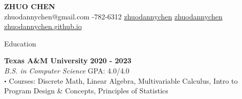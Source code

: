 \documentclass{resume} %
\newcommand{\sep}{\textcolor{black}{$\bigcdot$ }}
\begin{document}
\begin{center}
    \huge \textbf{\textcolor{titlecolor}{ZHUO CHEN}}\\
    \onehalfspacing
    \small \faEnvelope \space zhuodannychen@gmail.com \hspace{0.1cm}
    \faPhone {}-782-6312 \hspace{0.1cm}
    \faGithub \space \href{https://github.com/zhuodannychen}{zhuodannychen} \hspace{0.1cm}
    \faLinkedinSquare \space \href{https://www.linkedin.com/in/zhuodannychen/}{zhuodannychen} \hspace{0.1cm}
    \faLink \space \href{https://zhuodannychen.github.io/}{zhuodannychen.github.io}
\end{center}





\begin{rSection}{Education}

{\bf Texas A\&M University} \hfill {\bf 2020 - 2023}\\
\textit{B.S. in Computer Science} \hfill GPA: 4.0/4.0\\
    \hspace*{0.78em} \sep Courses: Discrete Math, Linear Algebra, Multivariable Calculus,
    Intro to Program Design \& Concepts, Principles of Statistics


\end{rSection}



\end{document}
